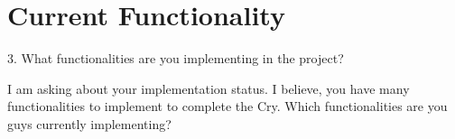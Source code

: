 \section{Current Functionality}

3. What functionalities are you implementing in the project?

I am asking about your implementation status.  I believe, you have many functionalities to implement to complete the Cry.  Which functionalities are  you guys currently implementing?

